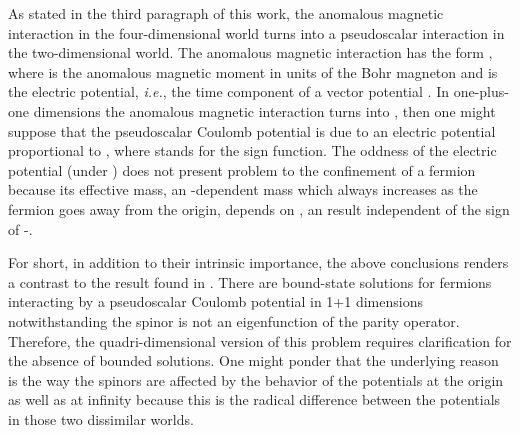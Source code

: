 \documentclass[a4paper,12pt,titlepage]{article}
\begin{document}
As stated in the third paragraph of this work, the anomalous magnetic
interaction in the four-dimensional world turns into a pseudoscalar
interaction in the two-dimensional world. The anomalous magnetic interaction
has the form \coordHE{}, where \myHighlight{$\mu $}\coordHE{}
is the anomalous magnetic moment in units of the Bohr magneton and \myHighlight{$\phi $}\coordHE{}
is the electric potential, \textit{i.e.}, the time component of a vector
potential \cite{tha}. In one-plus-one dimensions the anomalous magnetic
interaction turns into \coordHE{}, then one might
suppose that the pseudoscalar Coulomb potential is due to an electric
potential proportional to \coordHE{}, where \coordHE{} stands for the
sign function. The oddness of the electric potential (under \coordHE{}%
) does not present problem to the confinement of a fermion because its
effective mass, an \coordHE{}-dependent mass which always increases as the fermion
goes away from the origin, depends on \coordHE{}%
, an result independent of the sign of \coordHE{} \cite{asc2}-\cite{asc3}.

For short, in addition to their intrinsic importance, the above conclusions
renders a contrast to the result found in \cite{mck}. There are bound-state
solutions for fermions interacting by a pseudoscalar Coulomb potential in
1+1 dimensions notwithstanding the spinor is not an eigenfunction of the
parity operator. Therefore, the quadri-dimensional version of this problem
requires clarification for the absence of bounded solutions. One might
ponder that the underlying reason is the way the spinors are affected by the
behavior of the potentials at the origin as well as at infinity because this
is the radical difference between the potentials in those two dissimilar
worlds.
\end{document}
